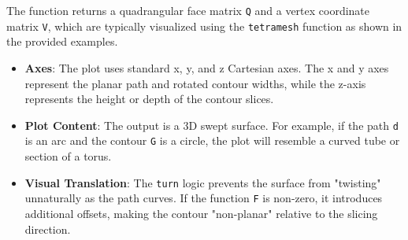 The function returns a quadrangular face matrix \texttt{Q} and a vertex coordinate matrix \texttt{V}, which are typically visualized using the \texttt{tetramesh} function as shown in the provided examples.

\begin{itemize}
\item \textbf{Axes}: The plot uses standard x, y, and z Cartesian axes. The x and y axes represent the planar path and rotated contour widths, while the z-axis represents the height or depth of the contour slices.
\item \textbf{Plot Content}: The output is a 3D swept surface. For example, if the path \texttt{d} is an arc and the contour \texttt{G} is a circle, the plot will resemble a curved tube or section of a torus.
\item \textbf{Visual Translation}: The \texttt{turn} logic prevents the surface from "twisting" unnaturally as the path curves. If the function \texttt{F} is non-zero, it introduces additional offsets, making the contour "non-planar" relative to the slicing direction.
\end{itemize}
